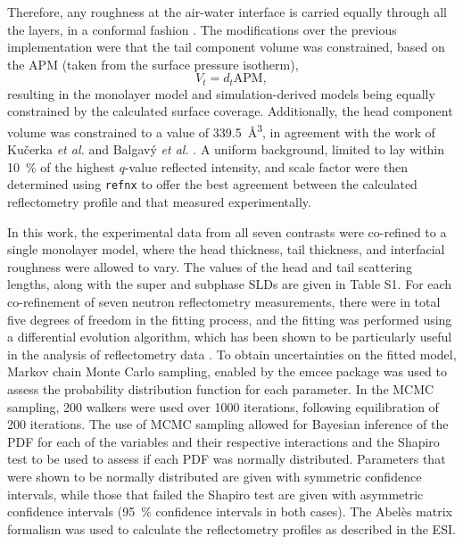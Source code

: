 \documentclass[amsmath,amssymb,twocolumn,superscriptaddress]{revtex4-1}
\begin{document}
Therefore, any roughness at the air-water interface is carried equally through all the layers, in a conformal fashion \cite{kozhevnikov_general_2012}.
The modifications over the previous implementation were that the tail component volume was constrained, based on the APM (taken from the surface pressure isotherm),
%
\begin{equation}
  V_t = d_t \text{APM},
\end{equation}
%
resulting in the monolayer model and simulation-derived models being equally constrained by the calculated surface coverage.
Additionally, the head component volume was constrained to a value of \SI{339.5}{\angstrom\cubed}, in agreement with the work of Ku\v{c}erka \emph{et al.}\cite{kucerka_determination_2004} and Balgav\'{y} \emph{et al.} \cite{balgavy_evaluation_2001}.
A uniform background, limited to lay within \SI{10}{\percent} of the highest $q$-value reflected intensity, and scale factor were then determined using \texttt{refnx} to offer the best agreement between the calculated reflectometry profile and that measured experimentally.

In this work, the experimental data from all seven contrasts were co-refined to a single monolayer model, where the head thickness, tail thickness, and interfacial roughness were allowed to vary.
The values of the head and tail scattering lengths, along with the super and subphase SLDs are given in Table S1.
For each co-refinement of seven neutron reflectometry measurements, there were in total five degrees of freedom in the fitting process, and the fitting was performed using a differential evolution algorithm, which has been shown to be particularly useful in the analysis of reflectometry data \cite{wormington_characterization_1999,bjorck_fitting_2011}.
To obtain uncertainties on the fitted model, Markov chain Monte Carlo sampling, enabled by the emcee package \cite{foreman-mackey_emcee_2013} was used to assess the probability distribution function for each parameter.
In the MCMC sampling, 200 walkers were used over 1000 iterations, following equilibration of 200 iterations.
The use of MCMC sampling allowed for Bayesian inference of the PDF for each of the variables and their respective interactions and the Shapiro test to be used to assess if each PDF was normally distributed.
Parameters that were shown to be normally distributed are given with symmetric confidence intervals, while those that failed the Shapiro test are given with asymmetric confidence intervals (\SI{95}{\percent} confidence intervals in both cases).
The Abel\`{e}s matrix formalism was used to calculate the reflectometry profiles as described in the ESI.
\end{document}
